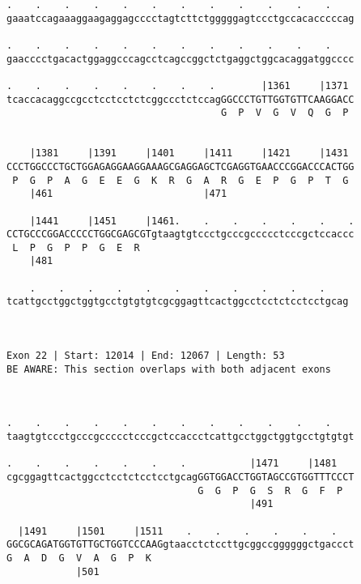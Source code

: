 \documentclass{article}
\begin{document}
\begin{Verbatim}
.    .    .    .    .    .    .    .    .    .    .    .    
gaaatccagaaaggaagaggagcccctagtcttctgggggagtccctgccacacccccag
                                                            
.    .    .    .    .    .    .    .    .    .    .    .    
gaacccctgacactggaggcccagcctcagccggctctgaggctggcacaggatggcccc
                                                            
.    .    .    .    .    .    .    .        |1361     |1371 
tcaccacaggccgcctcctcctctcggccctctccagGGCCCTGTTGGTGTTCAAGGACC
                                     G  P  V  G  V  Q  G  P 
                                                            
  
    |1381     |1391     |1401     |1411     |1421     |1431 
CCCTGGCCCTGCTGGAGAGGAAGGAAAGCGAGGAGCTCGAGGTGAACCCGGACCCACTGG
 P  G  P  A  G  E  E  G  K  R  G  A  R  G  E  P  G  P  T  G 
    |461                          |471                      
  
    |1441     |1451     |1461.    .    .    .    .    .    .
CCTGCCCGGACCCCCTGGCGAGCGTgtaagtgtccctgcccgccccctcccgctccaccc
 L  P  G  P  P  G  E  R                                     
    |481                                                    
  
    .    .    .    .    .    .    .    .    .    .    .    
tcattgcctggctggtgcctgtgtgtcgcggagttcactggcctcctctcctcctgcag
                                                           
                                                           
 
Exon 22 | Start: 12014 | End: 12067 | Length: 53
BE AWARE: This section overlaps with both adjacent exons



.    .    .    .    .    .    .    .    .    .    .    .    
taagtgtccctgcccgccccctcccgctccaccctcattgcctggctggtgcctgtgtgt
                                                            
.    .    .    .    .    .    .           |1471     |1481   
cgcggagttcactggcctcctctcctcctgcagGGTGGACCTGGTAGCCGTGGTTTCCCT
                                 G  G  P  G  S  R  G  F  P  
                                          |491              
  
  |1491     |1501     |1511    .    .    .    .    .    .   
GGCGCAGATGGTGTTGCTGGTCCCAAGgtaacctctccttgcggccggggggctgaccct
G  A  D  G  V  A  G  P  K                                   
            |501                                            
  

\end{Verbatim}
\end{document}
